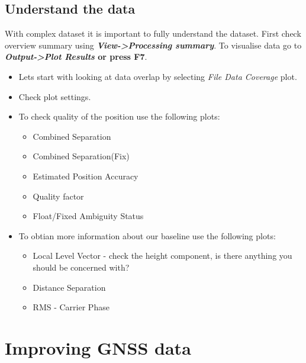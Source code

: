 \documentclass[11pt,fleqn]{book} %
\begin{document}
\subsection{Understand the data}

With complex dataset it is important to fully understand the dataset. First check overview summary using \textbf{\emph{View->Processing summary}}. To visualise data go to \textbf{\emph{Output->Plot Results} or press \textbf{F7}}.

\begin{itemize}
	\item Lets start with looking at data overlap by selecting\emph{ File Data Coverage} plot. 
	\item Check plot settings.
	\item To check quality of the position use the following plots:
	\begin{itemize}
		\item Combined Separation
		\item Combined Separation(Fix)
		\item Estimated Position Accuracy
		\item Quality factor
		\item Float/Fixed Ambiguity Status
\end{itemize}
	\item To obtian more information about our baseline use the following plots:
	\begin{itemize}
		\item Local Level Vector - check the height component, is there anything you should be concerned with?
		\item Distance Separation
		\item RMS - Carrier Phase
	\end{itemize}
\end{itemize}




\section{Improving GNSS data}
\end{document}
